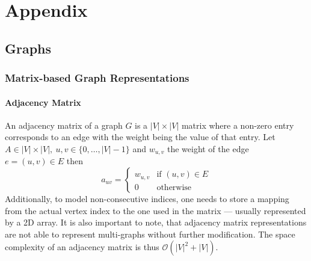  \chapter{Appendix}
    \section{Graphs}
     \subsection{Matrix-based Graph Representations}\label{mbr}
        \subsubsection*{Adjacency Matrix}
            An adjacency matrix of a graph $G$ is a $|V|\times|V|$ matrix where a non-zero entry corresponds to an edge with the weight being the value of that entry. 
            Let $A \in |V|\times|V|, \ u, v \in \{0, \dots, |V| - 1\}$ and $w_{u,v}$ the weight of the edge $e = (u,v) \in E$ then
            \[ a_{uv} = \begin{cases}
                        w_{u,v} & \text{if } (u,v) \in E \\
                        0 & \text{otherwise}
                        \end{cases}
            \]
            Additionally, to model non-consecutive indices, one needs to store a mapping from the actual vertex index to the one used in the matrix --- usually represented by a 2D array. 
            It is also important to note, that adjacency matrix representations are not able to represent multi-graphs without further modification.
            The space complexity of an adjacency matrix is thus $\mathcal{O}(|V|^2 + |V|)$.
                    
